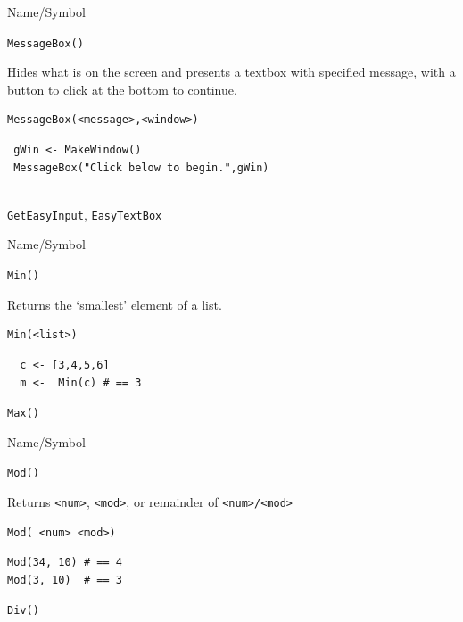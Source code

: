 \begin{desc}{Name/Symbol}
\item[Name/Symbol]	\verb+MessageBox()+

\item[Description]	Hides what is on the screen and presents a textbox with
  specified message, with a button to click at the bottom to continue.


\item[Usage]		
\begin{verbatim}
MessageBox(<message>,<window>)
\end{verbatim}

\item[Example]	
\begin{verbatim}
 gWin <- MakeWindow()
 MessageBox("Click below to begin.",gWin)


\end{verbatim}

\item[See Also]	\verb+GetEasyInput+, \verb+EasyTextBox+
\end{desc}



\begin{desc}{Name/Symbol}
\item[Name/Symbol]	\verb+Min()+

\item[Description]	Returns the `smallest' element of a list.

\item[Usage]	
\begin{verbatim}
Min(<list>)
\end{verbatim}

\item[Example]	
\begin{verbatim}
  c <- [3,4,5,6]
  m <-  Min(c) # == 3
\end{verbatim}

\item[See Also]	\verb+Max()+
\end{desc}

\begin{desc}{Name/Symbol}
\item[Name/Symbol]	\verb+Mod()+

\item[Description]	Returns \verb+<num>+, \verb+<mod>+, or remainder of \verb+<num>/<mod>+

\item[Usage]		
\begin{verbatim}
Mod( <num> <mod>)
\end{verbatim}

\item[Example]	
\begin{verbatim}
Mod(34, 10)	# == 4
Mod(3, 10)	# == 3
\end{verbatim}

\item[See Also]	\verb+Div()+
\end{desc}

